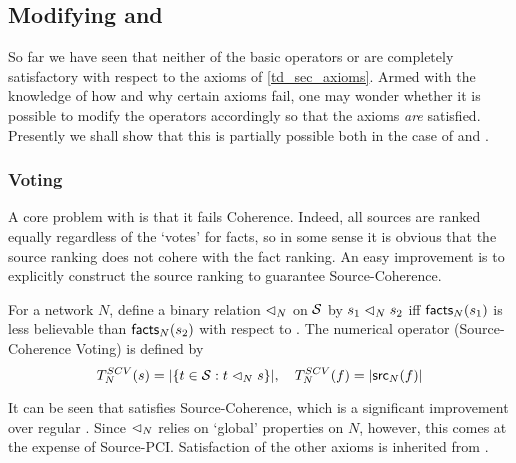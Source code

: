 \subsection{Modifying \voting{} and \sums{}}
\label{td_sec_modifying_voting_and_sums}

So far we have seen that neither of the basic operators \voting{} or \sums{}
are completely satisfactory with respect to the axioms of \cref{td_sec_axioms}.
Armed with the knowledge of how and why certain axioms fail, one may wonder
whether it is possible to modify the operators accordingly so that the axioms
\emph{are} satisfied. Presently we shall show that this is partially possible
both in the case of \voting{} and \sums{}.

\subsubsection{Voting}

A core problem with \voting{} is that it fails Coherence. Indeed, all sources
are ranked equally regardless of the `votes' for facts, so in some sense it is
obvious that the source ranking does not cohere with the fact
ranking.\footnotemark{} An easy improvement is to explicitly construct the
source ranking to guarantee Source-Coherence.



\begin{definition}
For a network $N$, define a binary relation $\scoh_N$ on $\S$ by $s_1
\scoh_N s_2$ iff $\facts_N(s_1)$ is less believable than
$\facts_N(s_2)$ with respect to \voting{}. The numerical operator \scvoting{}
(Source-Coherence Voting) is defined by
\[
    T_N^{SCV}(s) = |\{t \in \S : t \scoh_N s \}|,
    \quad
    T_N^{SCV}(f) = |\src_N(f)|
\]
\end{definition}

It can be seen that \scvoting{} satisfies Source-Coherence, which is a
significant improvement over regular \voting{}. Since $\scoh_N$ relies on
`global' properties on $N$, however, this comes at the expense of Source-PCI.
Satisfaction of the other axioms is inherited from \voting{}.

